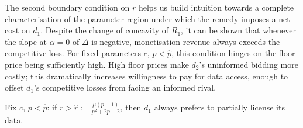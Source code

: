 \noindent The second boundary condition on $r$ helps us build intuition towards a complete characterisation of the parameter region under which the remedy imposes a net cost on $d_1$. Despite the change of concavity of $R_1$, it can be shown that whenever the slope at $\alpha=0$ of $\Delta$ is negative, monetisation revenue always exceeds the competitive loss. For fixed parameters $c, \, p < \hat{p}$, this condition hinges on the floor price being sufficiently high. High floor prices make $d_2$'s uninformed bidding more costly; this dramatically increases willingness to pay for data access, enough to offset $d_1$'s competitive losses from facing an informed rival.

\begin{lem}
   Fix $c, \, p < \hat{p}$: if $r > \hat{r}:= \frac{\mu (p-1)}{ p^2 + 2 p -2}$, then $d_1$ always prefers to partially license its data.
\end{lem}
